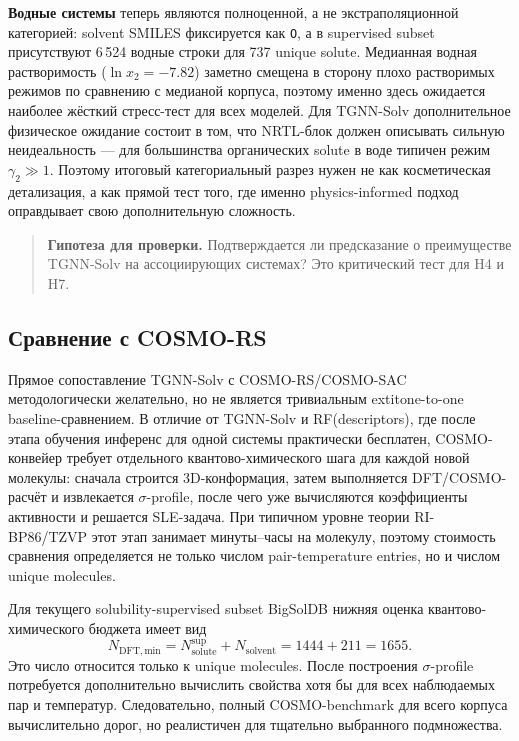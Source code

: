 \documentclass[11pt]{article}
\newcommand{\smarts}[1]{\nolinkurl{#1}}
\newcommand{\openquestion}[1]{\begin{quote}\textbf{Гипотеза для проверки.} #1\end{quote}}
\begin{document}
\textbf{Водные системы} теперь являются полноценной, а не экстраполяционной категорией: solvent SMILES фиксируется как \smarts{O}, а в supervised subset присутствуют 6\,524 водные строки для 737 unique solute. Медианная водная растворимость ($\ln x_2=-7.82$) заметно смещена в сторону плохо растворимых режимов по сравнению с медианой корпуса, поэтому именно здесь ожидается наиболее жёсткий стресс-тест для всех моделей. Для TGNN-Solv дополнительное физическое ожидание состоит в том, что NRTL-блок должен описывать сильную неидеальность --- для большинства органических solute в воде типичен режим $\gamma_2 \gg 1$. Поэтому итоговый категориальный разрез нужен не как косметическая детализация, а как прямой тест того, где именно physics-informed подход оправдывает свою дополнительную сложность.

\openquestion{Подтверждается ли предсказание о преимуществе TGNN-Solv на ассоциирующих системах? Это критический тест для H4 и H7.}

\subsection{Сравнение с COSMO-RS}
\label{subsec:cosmo-comparison}

Прямое сопоставление TGNN-Solv с COSMO-RS/COSMO-SAC методологически желательно, но не является тривиальным 	extit{one-to-one} baseline-сравнением. В отличие от TGNN-Solv и RF(descriptors), где после этапа обучения инференс для одной системы практически бесплатен, COSMO-конвейер требует отдельного квантово-химического шага для каждой новой молекулы: сначала строится 3D-конформация, затем выполняется DFT/COSMO-расчёт и извлекается $\sigma$-profile, после чего уже вычисляются коэффициенты активности и решается SLE-задача. При типичном уровне теории RI-BP86/TZVP этот этап занимает минуты--часы на молекулу, поэтому стоимость сравнения определяется не только числом pair-temperature entries, но и числом unique molecules.

Для текущего solubility-supervised subset BigSolDB нижняя оценка квантово-химического бюджета имеет вид
\begin{equation*}
N_{\mathrm{DFT,min}} = N_{\mathrm{solute}}^{\mathrm{sup}} + N_{\mathrm{solvent}} = 1444 + 211 = 1655.
\end{equation*}
Это число относится только к unique molecules. После построения $\sigma$-profile потребуется дополнительно вычислить свойства хотя бы для всех наблюдаемых пар и температур. Следовательно, полный COSMO-benchmark для всего корпуса вычислительно дорог, но реалистичен для тщательно выбранного подмножества.
\end{document}
